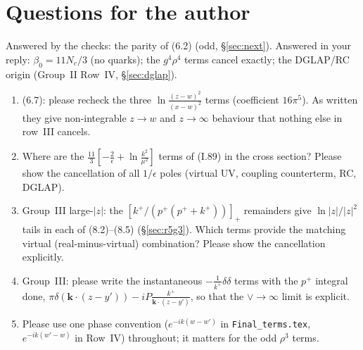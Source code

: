 \documentclass[10pt]{article}
\begin{document}
\section{Questions for the author}\label{sec:questions}
\noindent Answered by the checks: the parity of (6.2) (odd, \S\ref{sec:next}). Answered in your reply: $\beta_0=11N_c/3$ (no quarks); the $g^4\rho^4$ terms cancel exactly; the DGLAP/RC origin (Group~II Row~IV, \S\ref{sec:dglap}).
\begin{enumerate}[label=Q\arabic*.]
\item (6.7): please recheck the three $\ln\frac{(z-w)^2}{(x-w)^2}$ terms (coefficient $16\pi^5$). As written they give non-integrable $z\to w$ and $z\to\infty$ behaviour that nothing else in row~III cancels.
\item Where are the $\frac{11}{3}[-\frac2\epsilon+\ln\frac{k^2}{\mu^2}]$ terms of (I.89) in the cross section? Please show the cancellation of all $1/\epsilon$ poles (virtual UV, coupling counterterm, RC, DGLAP).
\item Group~III large-$|z|$: the $[k^+/(p^+(p^++k^+))]_+$ remainders give $\ln|z|/|z|^2$ tails in each of (8.2)--(8.5) (\S\ref{sec:r5g3}). Which terms provide the matching virtual (real-minus-virtual) combination? Please show the cancellation explicitly.
\item Group~III: please write the instantaneous $-\frac{1}{k^+}\delta\delta$ terms with the $p^+$ integral done, $\pi\delta(\mathbf k\cdot(z-y'))-iP\frac{k^+}{\mathbf k\cdot(z-y')}$, so that the $\vee\to\infty$ limit is explicit.
\item Please use one phase convention ($e^{-ik(w-w')}$ in \texttt{Final\_terms.tex}, $e^{-ik(w'-w)}$ in Row~IV) throughout; it matters for the odd $\rho^3$ terms.
\end{enumerate}

\end{document}
